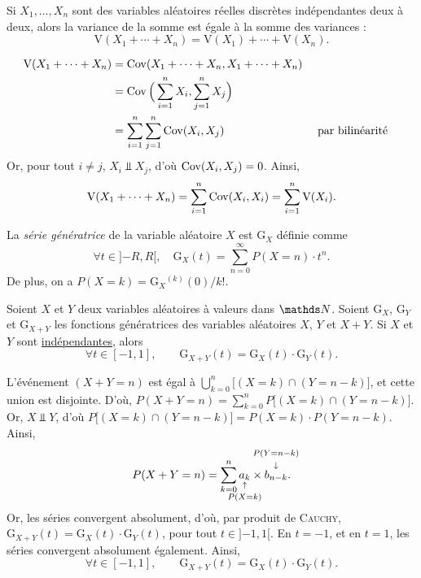 \begin{crlr}
	Si $X_1,\ldots,X_n$ sont des variables aléatoires réelles discrètes indépendantes deux à deux, alors la variance de la somme est égale à la somme des variances : \[
		\mathrm{V}(X_1 + \cdots + X_n) = \mathrm{V}(X_1) + \cdots + \mathrm{V}(X_n)
	.\] 
\end{crlr}

\begin{prv}
	\begin{align*}
		\mathrm{V}(X_1 + \cdots + X_n) &= \operatorname{Cov}(X_1 + \cdots + X_n, X_1 + \cdots + X_n) \\
		&= \operatorname{Cov}\Big(\sum_{i=1}^n X_i, \sum_{j=1}^n X_j\Big) \\
		&= \sum_{i=1}^n \sum_{j=1}^n \operatorname{Cov}(X_i, X_j) && \text{ par bilinéarité} \\
	\end{align*}
	Or, pour tout $i \neq j$, $X_i \mathrel{\Bot} X_j$, d'où $\operatorname{Cov}(X_i, X_j) = 0$.
	Ainsi, \[
		\mathrm{V}(X_1 + \cdots + X_n) = \sum_{i=1}^n \operatorname{Cov}(X_i, X_i) = \sum_{i=1}^n \mathrm{V}(X_i)
	.\]
\end{prv}

\begin{rap}
	La \textit{série génératrice} de la variable aléatoire $X$ est $\mathrm{G}_X$ définie comme \[
		\forall t \in {]{-R},R[},\quad\mathrm{G}_X(t) = \sum_{n = 0}^\infty P(X = n) \cdot t^n
	.\]
	De plus, on a $P(X = k) = \mathrm{G}_X{}^{(k)}(0) {\big/} k!$.
\end{rap}

\begin{prop}
	Soient $X$ et $Y$ deux variables aléatoires à valeurs dans $\N$. Soient $\mathrm{G}_X$, $\mathrm{G}_Y$ et $\mathrm{G}_{X+Y}$ les fonctions génératrices des variables aléatoires $X$, $Y$ et $X+Y$. Si $X$ et $Y$ sont \ul{indépendantes}, alors \[
		\forall t \in [-1,1],\quad\quad \mathrm{G}_{X+Y}(t) = \mathrm{G}_X(t) \cdot \mathrm{G}_Y(t)
	.\]
\end{prop}

\begin{prv}
	L'événement $(X + Y = n)$ est égal à $\bigcup_{k=0}^n \big[(X = k) \cap (Y = n - k)\big]$, et cette union est disjointe. D'où, $P(X + Y = n) = \sum_{k=0}^n P\big[(X = k) \cap (Y = n - k)\big]$.
	Or, $X \mathrel\Bot Y$, d'où $P\big[(X = k) \cap (Y = n- k)\big] = P(X = k) \cdot P(Y = n - k)$. Ainsi, \[
		P(X + Y = n) = \sum_{k=0}^n \underset{\mathclap{\substack{\uparrow\\[1mm] P(X = k)}}}{a_k} \times \overset{\mathclap{\substack{P(Y = n-k)\\[1mm]\downarrow}}}{b_{n-k}}
	.\] Or, les séries convergent absolument, d'où, par produit de \textsc{Cauchy}, $\mathrm{G}_{X + Y}(t) = \mathrm{G}_X(t) \cdot \mathrm{G}_Y(t)$, pour tout $t \in {]{-1},1[}$.
	En $t = -1$, et en $t = 1$, les séries convergent absolument également.
	Ainsi, \[
		\forall t \in [-1,1], \quad\quad \mathrm{G}_{X+Y}(t) = \mathrm{G}_X(t) \cdot \mathrm{G}_Y(t)
	.\]
\end{prv}



